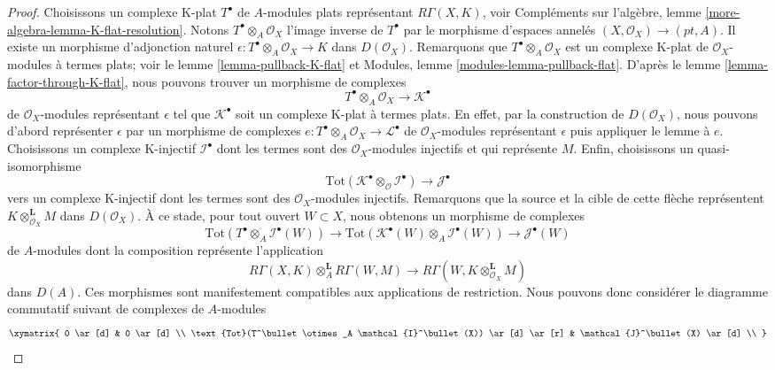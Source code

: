 \begin{proof}

Choisissons un complexe K-plat $T^\bullet$ de $A$-modules plats représentant
$R\Gamma(X, K)$, voir Compléments sur l'algèbre, lemme \ref{more-algebra-lemma-K-flat-resolution}. Notons $T^\bullet \otimes_A \mathcal{O}_X$ l'image inverse de $T^\bullet$
par le morphisme d'espaces annelés $(X, \mathcal{O}_X) \to (pt, A)$. Il existe un morphisme d'adjonction naturel
$\epsilon : T^\bullet \otimes_A \mathcal{O}_X \to K$ dans $D(\mathcal{O}_X)$. Remarquons que $T^\bullet \otimes_A \mathcal{O}_X$ est un complexe K-plat de $\mathcal{O}_X$-modules à termes plats; voir le lemme \ref{lemma-pullback-K-flat} et Modules, lemme \ref{modules-lemma-pullback-flat}. D'après le lemme \ref{lemma-factor-through-K-flat}, nous pouvons trouver un morphisme de complexes
$$
T^\bullet \otimes_A \mathcal{O}_X \longrightarrow \mathcal{K}^\bullet
$$
de $\mathcal{O}_X$-modules représentant $\epsilon$
tel que $\mathcal{K}^\bullet$ soit un complexe K-plat à termes plats. En effet, par la construction de
$D(\mathcal{O}_X)$, nous pouvons d'abord représenter $\epsilon$ par un morphisme de complexes
$e : T^\bullet \otimes_A \mathcal{O}_X \to \mathcal{L}^\bullet$
de $\mathcal{O}_X$-modules représentant $\epsilon$
puis appliquer le lemme à $e$. Choisissons un complexe K-injectif $\mathcal{I}^\bullet$ dont les termes sont des $\mathcal{O}_X$-modules injectifs et qui représente $M$. Enfin, choisissons un quasi-isomorphisme
$$
\text{Tot}(\mathcal{K}^\bullet \otimes_\mathcal{O} \mathcal{I}^\bullet)
\longrightarrow
\mathcal{J}^\bullet
$$
vers un complexe K-injectif dont les termes sont des $\mathcal{O}_X$-modules injectifs. Remarquons que la source et la cible de cette flèche représentent
$K \otimes_{\mathcal{O}_X}^\mathbf{L} M$ dans $D(\mathcal{O}_X)$. À ce stade, pour tout ouvert $W \subset X$, nous obtenons un morphisme de complexes
$$
\text{Tot}(T^\bullet \otimes_A \mathcal{I}^\bullet(W))
\to
\text{Tot}(\mathcal{K}^\bullet(W) \otimes_A \mathcal{I}^\bullet(W))
\to
\mathcal{J}^\bullet(W)
$$
de $A$-modules dont la composition représente l'application
$$
R\Gamma(X, K) \otimes_A^\mathbf{L} R\Gamma(W, M)
\longrightarrow
R\Gamma(W, K \otimes_{\mathcal{O}_X}^\mathbf{L} M)
$$
dans $D(A)$. Ces morphismes sont manifestement compatibles aux applications de restriction. Nous pouvons donc considérer le diagramme commutatif suivant de complexes de $A$-modules
$$
\xymatrix{
0 \ar[d] & 0 \ar[d] \\
\text{Tot}(T^\bullet \otimes_A \mathcal{I}^\bullet(X)) \ar[d] \ar[r] &
\mathcal{J}^\bullet(X) \ar[d] \\
}$$
\end{proof}
